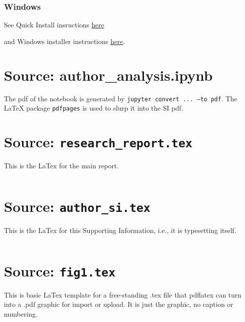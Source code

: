 \documentclass[letter,doc,natbib,11pt]{apa7}  %
\begin{document}
\subsubsection{Windows}


See Quick Install insructions 
\href{https://www.tug.org/texlive/quickinstall.html}{here}

and Windows installer instructions
\href{https://www.tug.org/texlive/acquire-netinstall.html}{here}.



\newpage
\normalsize
\section{Source: author\_analysis.ipynb}

The pdf of the notebook is generated by {\tt jupyter convert ... --to pdf}. The
LaTeX{} package {\tt pdfpages} is used to slurp it into the SI pdf.




\newpage
\section{Source: {\tt research\_report.tex}}
This is the LaTex{} for the main report. 

\inputminted{latex}{apa_ms.tex}


\newpage
\section{Source: {\tt author\_si.tex}}

This is the LaTex{} for this Supporting Information, i.e., it is 
typesetting itself. 

\inputminted{latex}{apa_si.tex}


\newpage
\section{Source: {\tt fig1.tex}}
This is basic LaTex{} template for a free-standing .tex file that pdflatex can turn
into a .pdf graphic for import or upload. It is just the graphic, no caption or numbering.
\end{document}
